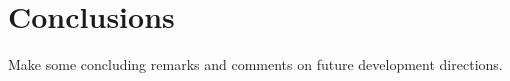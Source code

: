 \section{Conclusions}
\label{s:conclusions}

{\sf Make some concluding remarks and comments on future development 
directions.}



